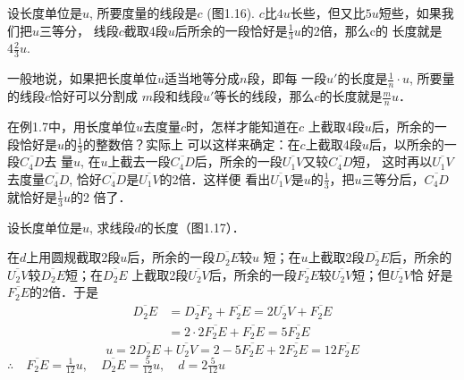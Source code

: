 \begin{example}
	设长度单位是$u$, 所要度量的线段是$c$ (图1.16). $c$比$4u$长些，但又比$5u$短些，如果我们把$u$三等分，
	线段$c$截取4段$u$后所余的一段恰好是$\frac{1}{3}u$的2倍，那么c的
	长度就是$4\frac{2}{3}u$.

\begin{figure}[htp]
	\centering
{}
	\caption{}
\end{figure}

一般地说，如果把长度单位$u$适当地等分成$n$段，即每
一段$u'$的长度是$\frac{1}{n}\cdot u$, 所要量的线段$c$恰好可以分割成
$m$段和线段$u'$等长的线段，那么$c$的长度就是$\frac{m}{n}u$．

在例1.7中，用长度单位$u$去度量$c$时，怎样才能知道在$c$
上截取4段$u$后，所余的一段恰好是$u$的$\frac{1}{3}$的整数倍？实际上
可以这样来确定：在$c$上截取4段$u$后，以所余的一段$\overline{C_4D}$去
量$u$, 在$u$上截去一段$\overline{C_4D}$后，所余的一段$\overline{U_1V}$又较$\overline{C_4D}$短，
这时再以$\overline{U_1V}$去度量$\overline{C_4D}$, 恰好$\overline{C_4D}$是$\overline{U_1V}$的2倍．这样便
看出$\overline{U_1V}$是$u$的$\frac{1}{3}$，把$u$三等分后，$\overline{C_4D}$就恰好是$\frac{1}{3}u$的2
倍了．
\end{example}

\begin{example}
	设长度单位是$u$, 求线段$d$的长度（图1.17）．
\begin{figure}[htp]
	\centering
{}	
	\caption{}
\end{figure}
\end{example}

\begin{solution}
	在$d$上用圆规截取2段$u$后，所余的一段$\overline{D_2E}$较$u$
短；在$u$上截取2段$\overline{D_2E}$后，所余的$\overline{U_2V}$较$\overline{D_2E}$短；在$\overline{D_2E}$
上截取2段$\overline{U_2V}$后，所余的一段$\overline{F_2E}$较$\overline{U_2V}$短；但$\overline{U_2V}$恰
好是$\overline{F_2E}$的2倍．于是
\[\begin{split}
	\overline{D_2E}&=\overline{D_2F_2}+\overline{F_2E}=2\overline{U_2V}+\overline{F_2E}\\
&=2\cdot 2\overline{F_2E}+\overline{F_2E}=5\overline{F_2E}
\end{split}\]
\[u=2\overline{D_2E}+\overline{U_2V}=2-5\overline{F_2E}+2\overline{F_2E}=12\overline{F_2E}\]
$\therefore\quad \overline{F_2E}=\frac{1}{12}u,\quad \overline{D_2E}=\frac{5}{12}u,\quad d=2\frac{5}{12}u$
\end{solution}


